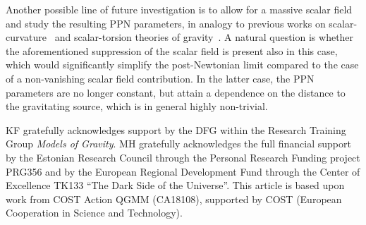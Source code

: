 \documentclass[notitlepage,a4paper,aps,prd,onecolumn,superscriptaddress,nofootinbib,groupedaddress,longbibliography]{revtex4-2}
\begin{document}
Another possible line of future investigation is to allow for a massive scalar field and study the resulting PPN parameters, in analogy to previous works on scalar-curvature~\cite{Hohmann:2013rba,Hohmann:2015kra,Hohmann:2017qje} and scalar-torsion theories of gravity~\cite{Emtsova:2019qsl}. A natural question is whether the aforementioned suppression of the scalar field is present also in this case, which would significantly simplify the post-Newtonian limit compared to the case of a non-vanishing scalar field contribution. In the latter case, the PPN parameters are no longer constant, but attain a dependence on the distance to the gravitating source, which is in general highly non-trivial.

\begin{acknowledgments}
KF gratefully acknowledges support by the DFG within the Research Training Group \textit{Models of Gravity}. MH gratefully acknowledges the full financial support by the Estonian Research Council through the Personal Research Funding project PRG356 and by the European Regional Development Fund through the Center of Excellence TK133 ``The Dark Side of the Universe''. This article is based upon work from COST Action QGMM (CA18108), supported by COST (European Cooperation in Science and Technology).
\end{acknowledgments}


\end{document}

